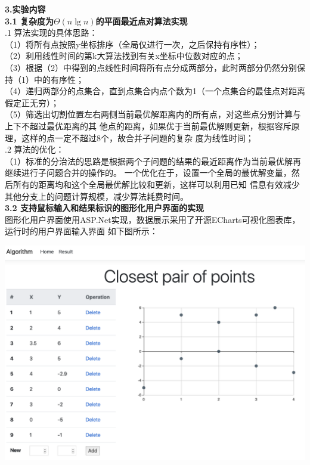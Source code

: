 \documentclass[a4paper]{article}
\begin{document}
\begin{enumerate}
  \textbf{3.实验内容}\\
  \textbf{3.1 复杂度为$\Theta(n\lg n)$的平面最近点对算法实现}\\
  .1 算法实现的具体思路：\\
  （1）将所有点按照y坐标排序（全局仅进行一次，之后保持有序性）；\\
  （2）利用线性时间的第k大算法找到有关x坐标中位数对应的点；\\
  （3）根据（2）中得到的点线性时间将所有点分成两部分，此时两部分仍然分别保持（1）中的有序性；\\
  （4）递归两部分的点集合，直到点集合内点个数为1（一个点集合的最佳点对距离假定正无穷）；\\
  （5）筛选出切割位置左右两侧当前最优解距离内的所有点，对这些点分别计算与上下不超过最优距离的其
  他点的距离，如果优于当前最优解则更新，根据容斥原理，这样的点一定不超过8个，故合并子问题的复杂
  度为线性时间；\\
  .2 算法的优化：\\
  （1）标准的分治法的思路是根据两个子问题的结果的最近距离作为当前最优解再继续进行子问题合并的操作的。
  一个优化在于，设置一个全局的最优解变量，然后所有的距离均和这个全局最优解比较和更新，这样可以利用已知
  信息有效减少其他分支上的问题计算规模，减少算法耗费时间。\\
  \medskip
  \textbf{3.2 支持鼠标输入和结果标识的图形化用户界面的实现}\\
  图形化用户界面使用ASP.Net实现，数据展示采用了开源ECharts可视化图表库，运行时的用户界面输入界面
  如下图所示：
  \bigskip
  \begin{center}
    \includegraphics[scale=0.3]{Pictures/cpop1.png}
  \end{center}

\end{enumerate}
\end{document}
